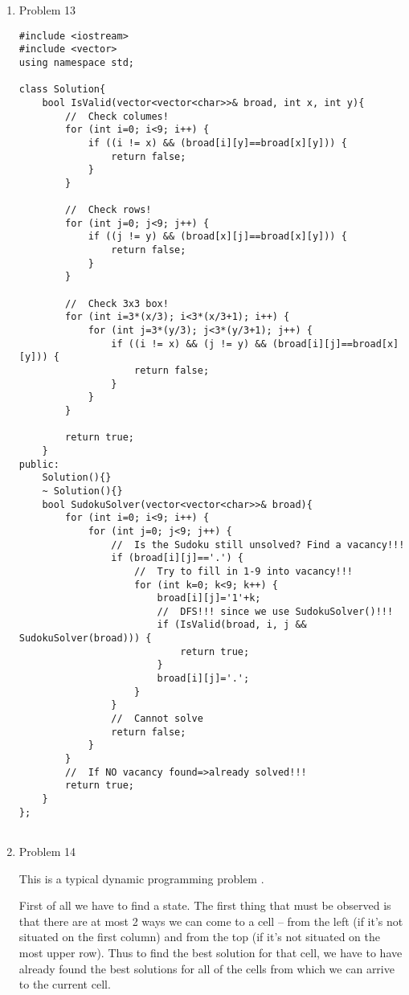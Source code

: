 \documentclass[10pt, onecolumn, draftcls]{IEEEtran}
\begin{document}
\begin{enumerate}
\item Problem 13
\begin{lstlisting}
#include <iostream>
#include <vector>
using namespace std;

class Solution{
    bool IsValid(vector<vector<char>>& broad, int x, int y){
        //  Check columes!
        for (int i=0; i<9; i++) {
            if ((i != x) && (broad[i][y]==broad[x][y])) {
                return false;
            }
        }
        
        //  Check rows!
        for (int j=0; j<9; j++) {
            if ((j != y) && (broad[x][j]==broad[x][y])) {
                return false;
            }
        }
        
        //  Check 3x3 box!
        for (int i=3*(x/3); i<3*(x/3+1); i++) {
            for (int j=3*(y/3); j<3*(y/3+1); j++) {
                if ((i != x) && (j != y) && (broad[i][j]==broad[x][y])) {
                    return false;
                }
            }
        }
        
        return true;
    }
public:
    Solution(){}
    ~ Solution(){}
    bool SudokuSolver(vector<vector<char>>& broad){
        for (int i=0; i<9; i++) {
            for (int j=0; j<9; j++) {
                //  Is the Sudoku still unsolved? Find a vacancy!!!
                if (broad[i][j]=='.') {
                    //  Try to fill in 1-9 into vacancy!!!
                    for (int k=0; k<9; k++) {
                        broad[i][j]='1'+k;
                        //  DFS!!! since we use SudokuSolver()!!!
                        if (IsValid(broad, i, j && SudokuSolver(broad))) {
                            return true;
                        }
                        broad[i][j]='.';
                    }
                }
                //  Cannot solve
                return false;
            }
        }
        //  If NO vacancy found=>already solved!!!
        return true;
    }
};


\end{lstlisting}

\item Problem 14

This is a typical dynamic programming problem \cite{prob14}.

First of all we have to find a state. The first thing that must be observed is that there are at most 2 ways we can come to a cell – from the left (if it’s not situated on the first column) and from the top (if it’s not situated on the most upper row). Thus to find the best solution for that cell, we have to have already found the best solutions for all of the cells from which we can arrive to the current cell.


\end{enumerate}
\end{document}
